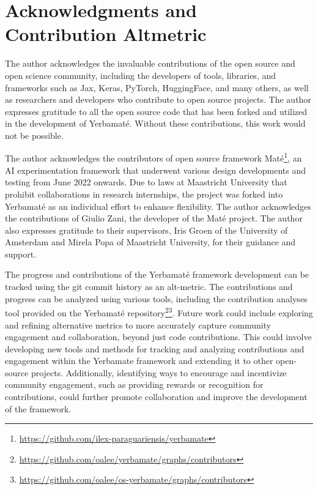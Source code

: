 

\section{Acknowledgments and Contribution Alt\-metric}

The author acknowledges the invaluable contributions of the open source and open science community, including the developers of tools, libraries, and frameworks such as Jax, Keras, PyTorch, HuggingFace, and many others, as well as researchers and developers who contribute to open source projects. The author expresses gratitude to all the open source code that has been forked and utilized in the development of Yerbamaté. Without these contributions, this work would not be possible.


The author acknowledges the contributors of open source framework Maté\footnote{\url{https://github.com/ilex-paraguariensis/yerbamate}}, an AI experimentation framework that underwent various design developments and testing from June 2022 onwards. Due to laws at Maastricht University that prohibit collaborations in research internships, the project was forked into Yerbamaté as an individual effort to enhance flexibility. The author acknowledges the contributions of Giulio Zani, the developer of the Maté project.
The author also expresses gratitude to their supervisors, Iris Groen of the University of Amsterdam and Mirela Popa of Maastricht University, for their guidance and support. 

The progress and contributions of the Yerbamaté framework development can be tracked using the git commit history as an alt-metric. The contributions and progress can be analyzed using various tools, including the contribution analyses tool provided on the Yerbamaté repository\footnote{\url{https://github.com/oalee/yerbamate/graphs/contributors}}\footnote{\url{https://github.com/oalee/os-yerbamate/graphs/contributors}}. Future work could include exploring and refining alternative metrics to more accurately capture community engagement and collaboration, beyond just code contributions. This could involve developing new tools and methods for tracking and analyzing contributions and engagement within the Yerbamate framework and extending it to other open-source projects. Additionally, identifying ways to encourage and incentivize community engagement, such as providing rewards or recognition for contributions, could further promote collaboration and improve the development of the framework.

